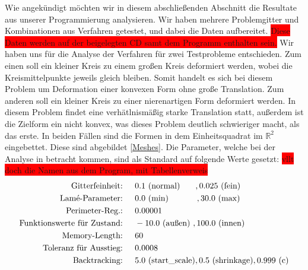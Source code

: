 \documentclass[bibliography=totoc,12pt,a4paper]{scrartcl}
\theoremstyle{exampstyle}
\numberwithin{equation}{section}
\begin{document}
Wie angekündigt möchten wir in diesem abschließenden Abschnitt die Resultate aus unserer Programmierung analysieren. Wir haben mehrere Problemgitter und Kombinationen aus Verfahren getestet, und dabei die Daten aufbereitet. \colorbox{red}{Diese Daten werden auf der beigelegten CD samt dem Programm enthalten sein.}
Wir haben uns für die Analyse der Verfahren für zwei Testprobleme entschieden. Zum einen soll ein kleiner Kreis zu einem großen Kreis deformiert werden, wobei die Kreismittelpunkte jeweils gleich bleiben. Somit handelt es sich bei diesem Problem um Deformation einer konvexen Form ohne große Translation. Zum anderen soll ein kleiner Kreis zu einer nierenartigen Form deformiert werden. In diesem Problem findet eine verhätlnismäßig starke Translation statt, außerdem ist die Zielform ein nicht konvex, was dieses Problem deutlich schwieriger macht, als das erste. In beiden Fällen sind die Formen in dem Einheitsquadrat im $\mathbb{R}^2$ eingebettet. Diese sind abgebildet \ref{Meshes}. 
Die Parameter, welche bei der Analyse in betracht kommen, sind als Standard auf folgende Werte gesetzt:
\colorbox{red}{vllt doch die Namen aus dem Program, mit Tabellenverweis}
\begin{align*}
\text{Gitterfeinheit: \hspace{0.2cm} }& 0.1 \text{ (normal)} \hspace{0.65cm} ,0.025 \text{ (fein)} \\
\text{Lamé-Parameter: \hspace{0.2cm} }& 0.0 \text{ (min)} \hspace{1.2cm}  ,30.0 \text{ (max)} \\
\text{Perimeter-Reg.: \hspace{0.2cm} }& 0.00001 \\
\text{Funktionswerte für Zustand: \hspace{0.2cm} }& -10.0 \text{ (außen) },  100.0 \text{ (innen)} \\
\text{Memory-Length: \hspace{0.2cm} }& 60 \\
\text{Toleranz für Ausstieg: \hspace{0.2cm} }& 0.0008 \\
\text{Backtracking: \hspace{0.2cm} }& 5.0 \text{ (start\_scale)}, 0.5 \text{ (shrinkage)}, 0.999 \text{ (c)}
\end{align*}
\end{document}
